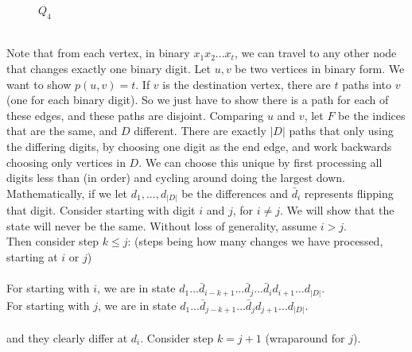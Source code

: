 \documentclass[letterpaper, 11pt]{article}
\newcommand{\1}{\mathds{1}}	%
\theoremstyle{definition}
\begin{document}
\begin{figure}[h]
\begin{minipage}{0.35\textwidth}
\caption{$Q_4$}
\end{minipage}
\end{figure}
~\\
Note that from each vertex, in binary $x_1x_2...x_t$, we can travel to any other node that changes exactly one binary digit. 
Let $u,v$ be two vertices in binary form. We want to show $p(u,v) = t$. If $v$ is the destination vertex, there are $t$ paths into $v$ (one for each binary digit). So we just have to show there is a path for each of these edges, and these paths are disjoint. Comparing $u$ and $v$,  let $F$ be the indices that are the same, and $D$ different. There are exactly $|D|$ paths that only using the differing digits, by choosing one digit as the end edge, and work backwards choosing only vertices in $D$. We can choose this unique by first processing all digits less than (in order) and cycling around doing the largest down. Mathematically, if we let $d_1, ..., d_{|D|}$ be the differences and $\bar{d}_i$ represents flipping that digit. Consider starting with digit $i$ and $j$, for $i \ne j$. We will show that the state will never be the same. Without loss of generality, assume $i > j$. \\ Then consider step $k \le j$: (steps being how many changes we have processed, starting at $i$ or $j$) \\~
\\For starting with $i$, we are in state $d_1 ... \bar{d}_{i-k+1} \dots \bar{d}_j \dots \bar{d}_i d_{i+1} \dots d_{|D|}$. 
\\For starting with $j$, we are in state $d_1 ... \bar{d}_{j-k+1} \dots \bar{d}_j  d_{j+1} \dots d_{|D|}$.  
\\~\\and they clearly differ at $d_i$. Consider step $k = j + 1$ (wraparound for $j$). \\~
\end{document}
